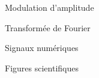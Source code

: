\item[\textsc{\scriptsize [Phys]}] Modulation d'amplitude
\item[\textsc{\scriptsize [Math]}] Transformée de Fourier
\item[\textsc{\scriptsize [Num]}] Signaux numériques
\item[\textsc{\scriptsize [Num]}] Figures scientifiques